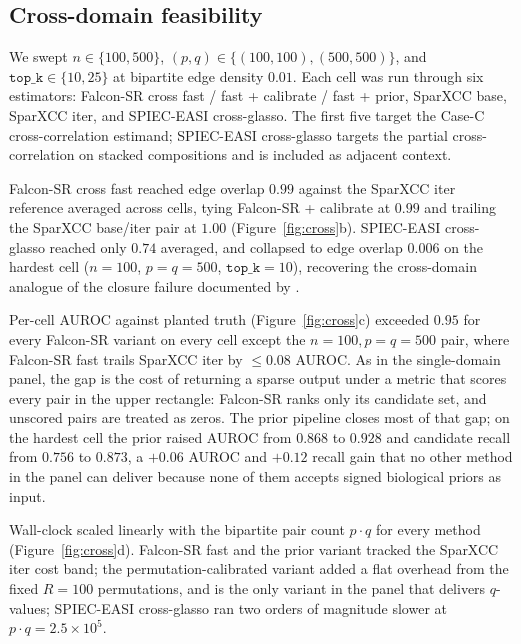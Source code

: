 \documentclass[unnumsec,webpdf,contemporary,large]{oup-authoring-template}
\theoremstyle{thmstyleone}
\theoremstyle{thmstyletwo}
\theoremstyle{thmstylethree}
\begin{document}
\subsection{Cross-domain feasibility}\label{sec:results-cross}

We swept $n \in \{100, 500\}$, $(p, q) \in \{(100, 100), (500, 500)\}$,
and $\texttt{top\_k} \in \{10, 25\}$ at bipartite edge density $0.01$.
Each cell was run through six estimators: Falcon-SR cross fast /
fast + calibrate / fast + prior, SparXCC base, SparXCC iter, and
SPIEC-EASI cross-glasso. The first five target the Case-C
cross-correlation estimand; SPIEC-EASI cross-glasso targets the
partial cross-correlation on stacked compositions and is included as
adjacent context.

Falcon-SR cross fast reached edge overlap $0.99$ against the SparXCC
iter reference averaged across cells, tying Falcon-SR + calibrate at
$0.99$ and trailing the SparXCC base/iter pair at $1.00$
(Figure~\ref{fig:cross}b). SPIEC-EASI cross-glasso reached only
$0.74$ averaged, and collapsed to edge overlap $0.006$ on the
hardest cell ($n = 100$, $p = q = 500$, $\texttt{top\_k} = 10$),
recovering the cross-domain analogue of the closure failure
documented by \citet{brunner2024crosskingdom}.

Per-cell AUROC against planted truth (Figure~\ref{fig:cross}c)
exceeded $0.95$ for every Falcon-SR variant on every cell except the
$n = 100, p = q = 500$ pair, where Falcon-SR fast trails SparXCC
iter by $\leq 0.08$ AUROC. As in the single-domain panel, the gap is
the cost of returning a sparse output under a metric that scores
every pair in the upper rectangle: Falcon-SR ranks only its
candidate set, and unscored pairs are treated as zeros. The prior
pipeline closes most of that gap; on the hardest cell the prior
raised AUROC from $0.868$ to $0.928$ and candidate recall from
$0.756$ to $0.873$, a $+0.06$ AUROC and $+0.12$ recall gain that no
other method in the panel can deliver because none of them accepts
signed biological priors as input.

Wall-clock scaled linearly with the bipartite pair count $p \cdot q$
for every method (Figure~\ref{fig:cross}d). Falcon-SR fast and the
prior variant tracked the SparXCC iter cost band; the
permutation-calibrated variant added a flat overhead from the fixed
$R = 100$ permutations, and is the only variant in the panel that
delivers $q$-values; SPIEC-EASI cross-glasso ran two orders of
magnitude slower at $p \cdot q = 2.5 \times 10^5$.
\end{document}

